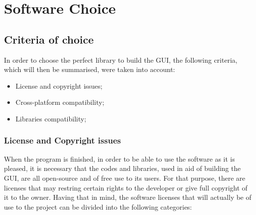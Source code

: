 





\chapter{Software Choice}
\label{cha:module_choice}



\section{Criteria of choice} 
\label{sub:criteria_of_choice}


\indent \indent In order to choose the perfect library to build the GUI, the following criteria, which will then be summarised, were taken into account:

\begin{itemize}
  \item License and copyright issues;
  \item Cross-platform compatibility;
  \item Libraries compatibility; 
  
  
\end{itemize}

\subsection{License and Copyright issues}
\label{sub:license_and_copyright}

\indent \indent When the program is finished, in order to be able to use the software as it is pleased, it is necessary that the codes and libraries, used in aid of building the GUI, are all open-source and of free use to its users. For that purpose, there are licenses that may restring certain rights to the developer or give full copyright of it to the owner. Having that in mind, the software licenses that will actually be of use to the project can be divided into the following categories:

